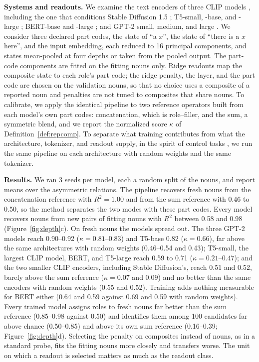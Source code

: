 \documentclass[10pt]{article}
\theoremstyle{plain}
\theoremstyle{remark}
\begin{document}
\textbf{Systems and readouts.} We examine the text encoders of three CLIP models \citep{radford2021clip}, including the one that conditions Stable Diffusion 1.5 \citep{rombach2022}; T5-small, -base, and -large \citep{raffel2020t5}; BERT-base and -large \citep{devlin2019bert}; and GPT-2 small, medium, and large \citep{radford2019gpt2}. We consider three declared part codes, the state of ``a $x$'', the state of ``there is a $x$ here'', and the input embedding, each reduced to 16 principal components, and states mean-pooled at four depths or taken from the pooled output. The part-code components are fitted on the fitting nouns only. Ridge readouts map the composite state to each role's part code; the ridge penalty, the layer, and the part code are chosen on the validation nouns, so that no choice uses a composite of a reported noun and penalties are not tuned to composites that share nouns. To calibrate, we apply the identical pipeline to two reference operators built from each model's own part codes: concatenation, which is role--filler, and the sum, a symmetric blend, and we report the normalized score $\kappa$ of Definition~\ref{def:repcomp}. To separate what training contributes from what the architecture, tokenizer, and readout supply, in the spirit of control tasks \citep{hewitt2019}, we run the same pipeline on each architecture with random weights and the same tokenizer.

\textbf{Results.} We ran 3 seeds per model, each a random split of the nouns, and report means over the asymmetric relations. The pipeline recovers fresh nouns from the concatenation reference with $R^2 = 1.00$ and from the sum reference with 0.46 to 0.50, so the method separates the two modes with these part codes. Every model recovers nouns from new pairs of fitting nouns with $R^2$ between 0.58 and 0.98 (Figure~\ref{fig:depth}c). On fresh nouns the models spread out. The three GPT-2 models reach 0.90--0.92 ($\kappa = 0.81$--$0.83$) and T5-base 0.82 ($\kappa = 0.66$), far above the same architectures with random weights (0.46--0.54 and 0.43); T5-small, the largest CLIP model, BERT, and T5-large reach 0.59 to 0.71 ($\kappa = 0.21$--$0.47$); and the two smaller CLIP encoders, including Stable Diffusion's, reach 0.51 and 0.52, barely above the sum reference ($\kappa = 0.07$ and $0.09$) and no better than the same encoders with random weights (0.55 and 0.52). Training adds nothing measurable for BERT either (0.64 and 0.59 against 0.69 and 0.59 with random weights). Every trained model assigns roles to fresh nouns far better than the sum reference (0.85--0.98 against 0.50) and identifies them among 100 candidates far above chance (0.50--0.85) and above its own sum reference (0.16--0.39; Figure~\ref{fig:depth}d). Selecting the penalty on composites instead of nouns, as in a standard probe, fits the fitting nouns more closely and transfers worse. The unit on which a readout is selected matters as much as the readout class.
\end{document}
